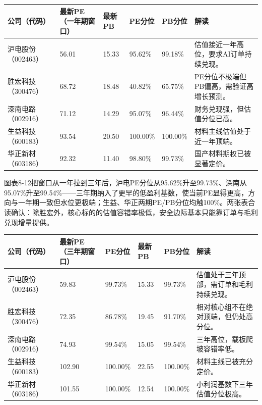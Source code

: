 \begin{exhibitbox}
\small
\begin{tabularx}{\textwidth}{L{1.8cm}R{1.8cm}R{1.8cm}R{1.8cm}R{1.8cm}X}
\toprule
\textbf{公司（代码）} & \textbf{最新PE（一年期窗口）} & \textbf{最新PB} & \textbf{PE分位} & \textbf{PB分位} & \textbf{解读} \\
\midrule
沪电股份（002463） & 56.01 & 15.33 & 95.62\% & 99.18\% & 估值接近一年高位，要求AI订单持续兑现。 \\
胜宏科技（300476） & 68.72 & 18.48 & 40.82\% & 65.75\% & PE分位不极端但PB偏高，需验证高增长预测。 \\
深南电路（002916） & 71.12 & 14.29 & 95.07\% & 96.44\% & 财务兑现强，但估值分位已高。 \\
生益科技（600183） & 93.54 & 20.50 & 100.00\% & 100.00\% & 材料主线估值处于近一年顶端。 \\
华正新材（603186） & 92.32 & 11.40 & 98.80\% & 99.73\% & 国产材料期权已被显著定价。 \\
\bottomrule
\end{tabularx}
\end{exhibitbox}

图表8-12把窗口从一年拉到三年后，沪电PE分位从95.62\%升至99.73\%、深南从95.07\%升至99.54\%——三年期纳入了更早的低盈利基数，使当前PE显得更高，方向与一年期一致但水位更极端；生益、华正两期PE/PB分位均触100\%。两张表合读确认：除胜宏外，核心标的的估值容错率极低，安全边际基本只能靠订单与毛利兑现增量提供。

\begin{exhibitbox}[图表8-12：三年估值分位检查]
\footnotesize
\begin{tabularx}{\textwidth}{L{1.8cm}R{1.6cm}R{1.6cm}R{1.6cm}R{1.6cm}X}
\toprule
\textbf{公司（代码）} & \textbf{最新PE（三年期窗口）} & \textbf{PE分位} & \textbf{最新PB} & \textbf{PB分位} & \textbf{解读} \\
\midrule
沪电股份（002463） & 59.83 & 99.73\% & 15.33 & 99.73\% & 估值处于三年顶部，需订单和毛利持续兑现。 \\
胜宏科技（300476） & 72.35 & 86.78\% & 19.45 & 91.70\% & 相对核心组不在绝对顶端，但仍处高分位。 \\
深南电路（002916） & 74.93 & 99.54\% & 15.05 & 99.54\% & 三年高位，载板爬坡容错率低。 \\
生益科技（600183） & 102.90 & 100.00\% & 22.55 & 100.00\% & 材料主线已被充分定价。 \\
华正新材（603186） & 101.55 & 100.00\% & 12.54 & 100.00\% & 小利润基数下三年估值分位极高。 \\
\bottomrule
\end{tabularx}
\end{exhibitbox}

